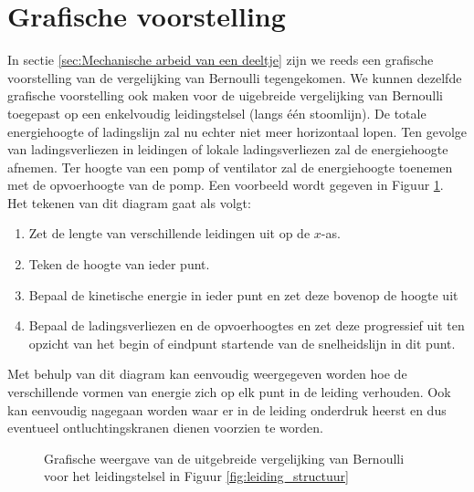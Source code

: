 		\section{Grafische voorstelling}
In sectie \ref{sec:Mechanische arbeid van een deeltje} zijn we reeds een grafische voorstelling van de vergelijking van Bernoulli tegengekomen. We kunnen dezelfde grafische voorstelling ook maken voor de uigebreide vergelijking van Bernoulli toegepast op een enkelvoudig leidingstelsel (langs \'e\'en stoomlijn). De totale energiehoogte of ladingslijn zal nu echter niet meer horizontaal lopen. Ten gevolge van ladingsverliezen in leidingen of lokale ladingsverliezen zal de energiehoogte afnemen. Ter hoogte van een pomp of ventilator zal de energiehoogte toenemen met de opvoerhoogte van de pomp. Een voorbeeld wordt gegeven in Figuur \ref{fig:leidingstelsel_energiehoogte}. Het tekenen van dit diagram gaat als volgt:
\begin{enumerate}
	\item Zet de lengte van verschillende leidingen uit op de $x$-as.
	\item Teken de hoogte van ieder punt.
	\item Bepaal de kinetische energie in ieder punt en zet deze bovenop de hoogte uit
	\item Bepaal de ladingsverliezen en de opvoerhoogtes en zet deze progressief uit ten opzicht van het begin of eindpunt startende van de snelheidslijn in dit punt.
\end{enumerate}
Met behulp van dit diagram kan eenvoudig weergegeven worden hoe de verschillende vormen van energie zich op elk punt in de leiding verhouden. Ook kan eenvoudig nagegaan worden waar er in de leiding onderdruk heerst en dus eventueel ontluchtingskranen dienen voorzien te worden.
\begin{figure}
	\centering
	
	\caption{Grafische weergave van de uitgebreide vergelijking van Bernoulli voor het leidingstelsel in Figuur \ref{fig:leiding_structuur}}
	\label{fig:leidingstelsel_energiehoogte}
\end{figure}


